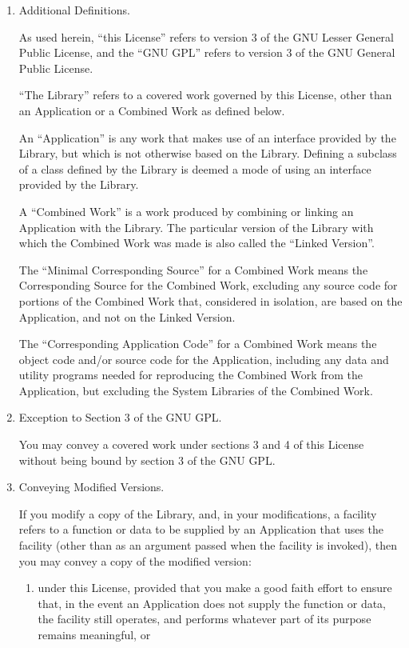 \documentclass[11pt,a4paper, twoside]{article}
\begin{document}
\begin{enumerate}
\addtocounter{enumi}{-1}  %

\item Additional Definitions.

  As used herein, ``this License'' refers to version 3 of the GNU Lesser
General Public License, and the ``GNU GPL'' refers to version 3 of the GNU
General Public License.

  ``The Library'' refers to a covered work governed by this License,
other than an Application or a Combined Work as defined below.

  An ``Application'' is any work that makes use of an interface provided
by the Library, but which is not otherwise based on the Library.
Defining a subclass of a class defined by the Library is deemed a mode
of using an interface provided by the Library.

  A ``Combined Work'' is a work produced by combining or linking an
Application with the Library.  The particular version of the Library
with which the Combined Work was made is also called the ``Linked
Version''.

  The ``Minimal Corresponding Source'' for a Combined Work means the
Corresponding Source for the Combined Work, excluding any source code
for portions of the Combined Work that, considered in isolation, are
based on the Application, and not on the Linked Version.

  The ``Corresponding Application Code'' for a Combined Work means the
object code and/or source code for the Application, including any data
and utility programs needed for reproducing the Combined Work from the
Application, but excluding the System Libraries of the Combined Work.

\item Exception to Section 3 of the GNU GPL.

  You may convey a covered work under sections 3 and 4 of this License
without being bound by section 3 of the GNU GPL.

\item Conveying Modified Versions.

  If you modify a copy of the Library, and, in your modifications, a
facility refers to a function or data to be supplied by an Application
that uses the facility (other than as an argument passed when the
facility is invoked), then you may convey a copy of the modified
version:

   \begin{enumerate}
   \item under this License, provided that you make a good faith effort to
   ensure that, in the event an Application does not supply the
   function or data, the facility still operates, and performs
   whatever part of its purpose remains meaningful, or


\end{enumerate}
\end{enumerate}
\end{document}
